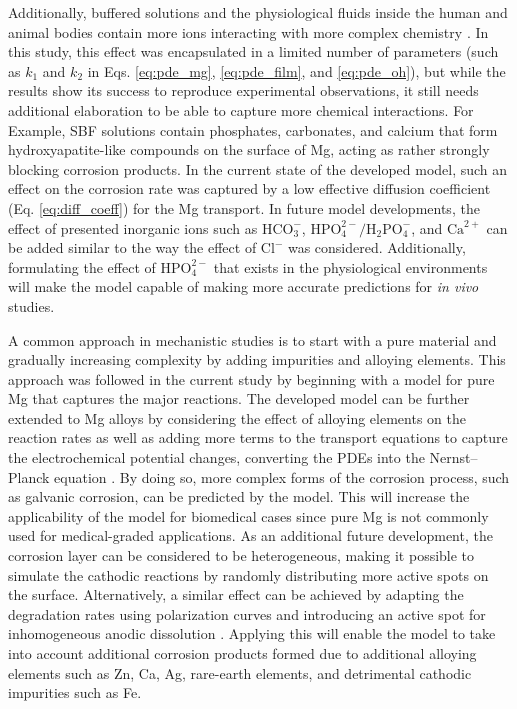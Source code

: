 Additionally, buffered solutions and the physiological fluids inside the human and animal bodies contain more ions interacting with more complex chemistry \cite{Mei2020}. In this study, this effect was encapsulated in a limited number of parameters (such as $k_1$ and $k_2$ in Eqs. \ref{eq:pde_mg}, \ref{eq:pde_film}, and \ref{eq:pde_oh}), but while the results show its success to reproduce experimental observations, it still needs additional elaboration to be able to capture more chemical interactions. For Example, SBF solutions contain phosphates, carbonates, and calcium that form hydroxyapatite-like compounds on the surface of Mg, acting as rather strongly blocking corrosion products. In the current state of the developed model, such an effect on the corrosion rate was captured by a low effective diffusion coefficient (Eq. \ref{eq:diff_coeff}) for the Mg transport. In future model developments, the effect of presented inorganic ions such as $\mathrm{HCO}^{-}_3$, $\mathrm{HPO}^{2-}_4/\mathrm{H}_2\mathrm{PO}^{-}_4$, and $\mathrm{Ca}^{2+}$ can be added similar to the way the effect of $\mathrm{Cl}^{-}$ was considered. Additionally, formulating the effect of $\mathrm{HPO}^{2-}_4$ that exists in the physiological environments will make the model capable of making more accurate predictions for \textit{in vivo} studies.

A common approach in mechanistic studies is to start with a pure material and gradually increasing complexity by adding impurities and alloying elements. This approach was followed in the current study by beginning with a model for pure Mg that captures the major reactions. The developed model can be further extended to Mg alloys by considering the effect of alloying elements on the reaction rates as well as adding more terms to the transport equations to capture the electrochemical potential changes, converting the PDEs into the Nernst–Planck equation \cite{Deshpande2011}. By doing so, more complex forms of the corrosion process, such as galvanic corrosion, can be predicted by the model. This will increase the applicability of the model for biomedical cases since pure Mg is not commonly used for medical-graded applications. As an additional future development, the corrosion layer can be considered to be heterogeneous, making it possible to simulate the cathodic reactions by randomly distributing more active spots on the surface. Alternatively, a similar effect can be achieved by adapting the degradation rates using polarization curves and introducing an active spot for inhomogeneous anodic dissolution \cite{Dolgikh2019}. Applying this will enable the model to take into account additional corrosion products formed due to additional alloying elements such as Zn, Ca, Ag, rare-earth elements, and detrimental cathodic impurities such as Fe.

